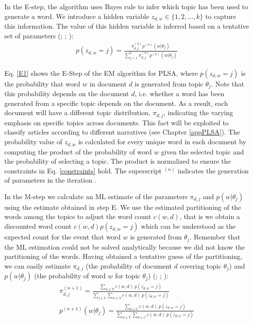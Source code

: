 \documentclass[11pt,a4paper,english,oneside]{book}
\numberwithin{equation}{chapter}
\begin{document}
In the E-step, the algorithm uses Bayes rule to infer which topic has been used to generate a word. We introduce a hidden variable $z_{d,w} \in \{1,2,...,k\}$ to capture this information. The value of this hidden variable is inferred based on a tentative set of parameters (\citealp[p. 290]{Hofmann.1999}; \citeyear[p. 182]{Hofmann.2001}; \citealp[pp. 362--374]{Zhai.2016}):
\begin{align}\label{E1}
p(z_{d,w}=j)=\frac{\pi_{d,j}^{(n)}p^{(n)}(w|\theta_j)}{\sum_{j=1}^{k}\pi_{d,j}^{(n)}p^{(n)}(w|\theta_j)}
\end{align}

Eq. \ref{E1} shows the E-Step of the EM algorithm for PLSA, where $p(z_{d,w}=j)$ is the probability that word $w$ in document $d$ is generated from topic $\theta_j$. Note that this probability depends on the document $d$, i.e. whether a word has been generated from a specific topic depends on the document. As a result, each document will have a different topic distribution, $\pi_{d,j}$, indicating the varying emphasis on specific topics across documents. This fact will be exploited to classify articles according to different narratives (see Chapter \ref{appPLSA}). The probability value of $z_{d,w}$ is calculated for every unique word in each document by computing the product of the probability of word $w$ given the selected topic and the probability of selecting a topic. The product is normalized to ensure the constraints in Eq. \ref{constraints} hold. The superscript $^{(n)}$ indicates the generation of parameters in the iteration \citep[pp. 374--376]{Zhai.2016}.  

In the M-step we calculate an ML estimate of the parameters $\pi_{d,j}$ and $p(w|\theta_j)$ using the estimate obtained in step E. We use the estimated partitioning of the words among the topics to adjust the word count $c(w,d)$, that is we obtain a discounted word count $c(w,d) p(z_{d,w}=j)$ which can be understood as the expected count for the event that word $w$ is generated from $\theta_j$. Remember that the ML estimation could not be solved analytically because we did not know the partitioning of the words. Having obtained a tentative guess of the partitioning, we can easily estimate $\pi_{d,j}$ (the probability of document $d$ covering topic $\theta_j$) and $p(w|\theta_j)$ (the probability of word $w$ for topic $\theta_j$) (\citealp[p. 290]{Hofmann.1999}; \citeyear[p. 182]{Hofmann.2001}; \citealp[pp. 364--375]{Zhai.2016}):
\begin{align}%
\label{M1pi} \pi_{d,j}^{(n+1)}=\frac{\sum_{w \in V} c(w,d)\ p(z_{d,w}=j)}{\sum_{j \in k}\sum_{w \in V}c(w,d) \ p(z_{d,w}=j)}\\
\label{M1theta} p^{(n+1)}(w|\theta_j)=\frac{\sum_{d \in C} c(w,d)\ p(z_{d,w}=j)}{\sum_{w \in V}\sum_{d \in C}c(w,d)\ p(z_{d,w}=j)}
\end{align}
\end{document}
